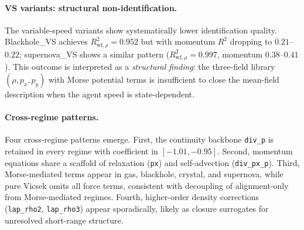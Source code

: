 \paragraph{VS variants: structural non-identification.}
\label{subsec:outcomes_vs}

The variable-speed variants show systematically lower identification
quality.  Blackhole\_VS achieves $R^2_{\text{wf},\rho}=0.952$ but with
momentum $R^2$ dropping to $0.21$--$0.22$; supernova\_VS shows a similar
pattern ($R^2_{\text{wf},\rho}=0.997$, momentum $0.38$--$0.41$).
This outcome is interpreted as a \emph{structural finding}: the three-field
library $(\rho, p_x, p_y)$ with Morse potential terms is insufficient to
close the mean-field description when the agent speed is state-dependent.

\paragraph{Cross-regime patterns.}
\label{subsec:outcomes_patterns}

Four cross-regime patterns emerge.
First, the continuity backbone \texttt{div\_p} is retained in
every regime with coefficient in $[-1.01, -0.95]$.
Second, momentum equations share a scaffold of
relaxation (\texttt{px}) and self-advection (\texttt{div\_px\_p}).
Third, Morse-mediated terms appear in gas, blackhole, crystal, and
supernova, while pure Vicsek omits all force terms, consistent
with decoupling of alignment-only from Morse-mediated regimes.
Fourth, higher-order density corrections (\texttt{lap\_rho2},
\texttt{lap\_rho3}) appear sporadically, likely as closure surrogates
for unresolved short-range structure.
